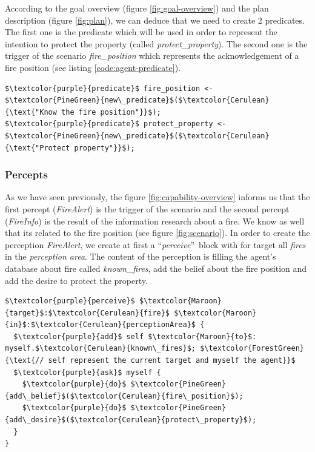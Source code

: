 \documentclass[12pt, a4paper]{memoir} %
\begin{document}
					According to the goal overview (figure \ref{fig:goal-overview}) and the plan description (figure \ref{fig:plan}), we can deduce that we need to create
					2 predicates. The first one is the predicate which will be used in order to represent the intention to protect the property (called \textit{protect\_property}).
					The second one is the trigger of the scenario \textit{fire\_position} which represents the acknowledgement of a fire position (see listing \ref{code:agent-predicate}).

					\begin{lstlisting}[mathescape,caption=Agent predicates.,label=code:agent-predicate]
$\textcolor{purple}{predicate}$ fire_position <- $\textcolor{PineGreen}{new\_predicate}$($\textcolor{Cerulean}{\text{"Know the fire position"}}$);
$\textcolor{purple}{predicate}$ protect_property <- $\textcolor{PineGreen}{new\_predicate}$($\textcolor{Cerulean}{\text{"Protect property"}}$);
					\end{lstlisting}

				\subsubsection{Percepts}

					As we have seen previously, the figure \ref{fig:capability-overview} informs us that the first percept (\textit{FireAlert}) is the trigger of the
					scenario and the second percept (\textit{FireInfo}) is the result of the information research about a fire. We know as well that its related to the fire position (see figure \ref{fig:scenario}).
					In order to create the perception \textit{FireAlert}, we create at first a \textquotedblleft\textit{perceive}\textquotedblright ~block with for target all \textit{fires}
					in the \textit{perception area}.
					The content of the perception is filling the agent's database about fire called \textit{known\_fires}, add the belief about the fire position and add the desire to protect the property.

					\begin{lstlisting}[mathescape,caption=Perception FireAlert.,label=code:percept-firealert]
$\textcolor{purple}{perceive}$ $\textcolor{Maroon}{target}$:$\textcolor{Cerulean}{fire}$ $\textcolor{Maroon}{in}$:$\textcolor{Cerulean}{perceptionArea}$ {
  $\textcolor{purple}{add}$ self $\textcolor{Maroon}{to}$: myself.$\textcolor{Cerulean}{known\_fires}$; $\textcolor{ForestGreen}{\text{// self represent the current target and myself the agent}}$
  $\textcolor{purple}{ask}$ myself {
    $\textcolor{purple}{do}$ $\textcolor{PineGreen}{add\_belief}$($\textcolor{Cerulean}{fire\_position}$);
    $\textcolor{purple}{do}$ $\textcolor{PineGreen}{add\_desire}$($\textcolor{Cerulean}{protect\_property}$);
  }
}
					\end{lstlisting}
\end{document}
